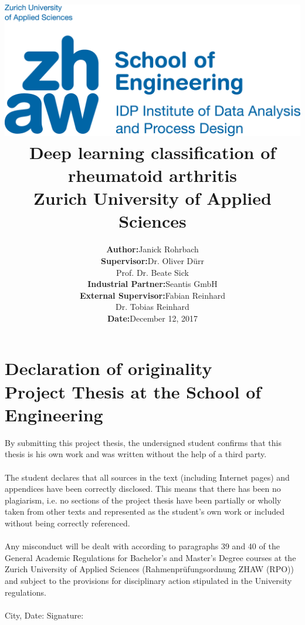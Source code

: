 \documentclass[12pt]{article}
\begin{document}
\title{
\vspace{-2.0cm}
\includegraphics{zhaw}\\ 
\vspace{3cm}
Deep learning classification of rheumatoid arthritis\\
{\Large Zurich University of Applied Sciences}}
\author{\begin{tabular}{rl}
  \textbf{Author:} & Janick Rohrbach \\
  \textbf{Supervisor:} & Dr. Oliver Dürr \\ & Prof. Dr. Beate Sick \\
  \textbf{Industrial Partner:} & Seantis GmbH \\
  \textbf{External Supervisor:} & Fabian Reinhard \\ & Dr. Tobias Reinhard \\
  \textbf{Date:} & December 12, 2017
\end{tabular}}
\date{}
\maketitle

\newpage

\section*{Declaration of originality\\ \large{Project Thesis at the School of Engineering}}
By submitting this project thesis, the undersigned student confirms that this thesis is his own work and was written without the help of a third party. \\
\\
The student declares that all sources in the text (including Internet pages) and appendices have been correctly disclosed. This means that there has been no plagiarism, i.e. no sections of the project thesis have been partially or wholly taken from other texts and represented as the student’s own work or included without being correctly referenced. \\
\\
Any misconduct will be dealt with according to paragraphs 39 and 40 of the General Academic Regulations for Bachelor’s and Master’s Degree courses at the Zurich University of Applied Sciences (Rahmenprüfungsordnung ZHAW (RPO)) and subject to the provisions for disciplinary action stipulated in the University regulations.\\
\vspace{3cm} \\
City, Date: \hspace{5cm} Signature:
\end{document}
